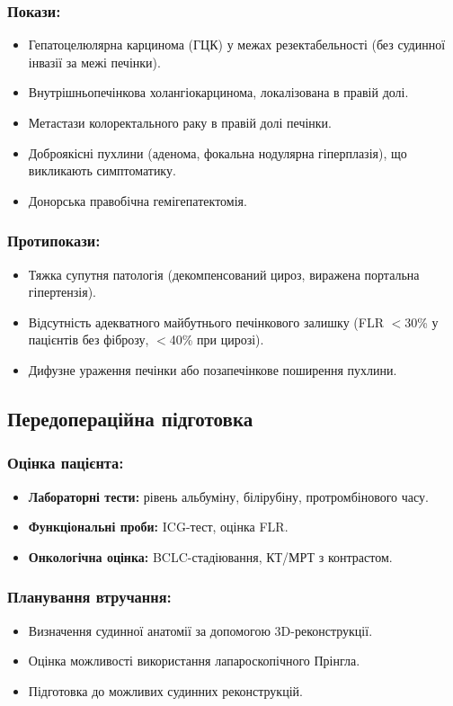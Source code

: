 \begin{refsection}
\subsubsection{Покази:}
\begin{itemize}
    \item Гепатоцелюлярна карцинома (ГЦК) у межах резектабельності (без судинної інвазії за межі печінки).
    \item Внутрішньопечінкова холангіокарцинома, локалізована в правій долі.
    \item Метастази колоректального раку в правій долі печінки.
    \item Доброякісні пухлини (аденома, фокальна нодулярна гіперплазія), що викликають симптоматику.
    \item Донорська правобічна гемігепатектомія.
\end{itemize}

\subsubsection{Протипокази:}
\begin{itemize}
    \item Тяжка супутня патологія (декомпенсований цироз, виражена портальна гіпертензія).
    \item Відсутність адекватного майбутнього печінкового залишку (FLR $<$30\% у пацієнтів без фіброзу, $<$40\% при цирозі).
    \item Дифузне ураження печінки або позапечінкове поширення пухлини.
\end{itemize}

\subsection{Передопераційна підготовка}
\subsubsection{Оцінка пацієнта:}
\begin{itemize}
    \item \textbf{Лабораторні тести:} рівень альбуміну, білірубіну, протромбінового часу.
    \item \textbf{Функціональні проби:} ICG-тест, оцінка FLR.
    \item \textbf{Онкологічна оцінка:} BCLC-стадіювання, КТ/МРТ з контрастом.
\end{itemize}

\subsubsection{Планування втручання:}
\begin{itemize}
    \item Визначення судинної анатомії за допомогою 3D-реконструкції.
    \item Оцінка можливості використання лапароскопічного Прінгла.
    \item Підготовка до можливих судинних реконструкцій.
\end{itemize}


\end{refsection}
